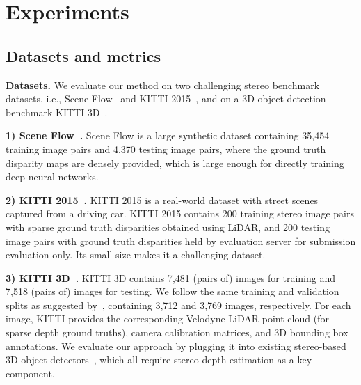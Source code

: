 \documentclass{article}
\renewcommand{\paragraph}[1]{\vspace{-0.5ex}\textbf{#1}}
\begin{document}
 \section{Experiments}
\label{sec: exp}

 


\subsection{Datasets and metrics}
\paragraph{Datasets.} We evaluate our method on two challenging stereo benchmark datasets, i.e., Scene Flow~\cite{mayer2016large} and KITTI 2015~\cite{menze2015object}, and on a 3D object detection
benchmark KITTI 3D~\cite{geiger2013vision,geiger2012we}.

\paragraph{1) Scene Flow~\cite{mayer2016large}.} 
Scene Flow is a large synthetic dataset containing 35,454 training image pairs and 4,370 testing image pairs, where the ground truth disparity maps are densely provided, which is large enough for directly training deep neural networks.

\paragraph{2) KITTI 2015~\cite{menze2015object}.} 
KITTI 2015 is a  real-world dataset with street scenes captured from a driving car. KITTI 2015 contains 200 training stereo image pairs with sparse ground truth disparities obtained using LiDAR, and 200 testing image pairs with ground truth disparities held by evaluation server for submission evaluation only. Its small size makes it a challenging dataset. 

\paragraph{3) KITTI 3D~\cite{geiger2013vision,geiger2012we}.}
KITTI 3D contains 7,481 (pairs of) images for training and 7,518 (pairs of) images for testing. We follow the
same training and validation splits as suggested by~\citet{chen20153d}, containing 3,712 and 3,769 images, respectively. For each image, KITTI provides the corresponding Velodyne LiDAR point cloud (for sparse depth ground truths), camera calibration matrices, and 3D bounding box annotations. We evaluate our approach by plugging it into existing stereo-based 3D object detectors~\cite{you2019pseudo,pseudoLiDAR,chen2020dsgn}, which all require stereo depth estimation as a key component.
\end{document}
